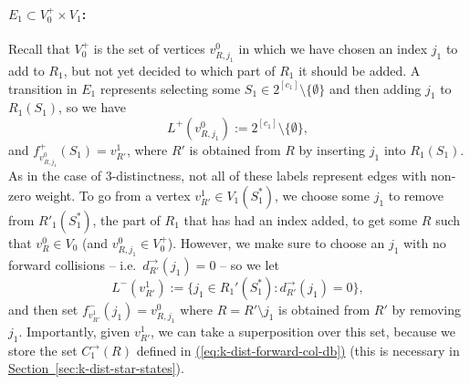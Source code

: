\documentclass{article}
\newcommand{\eq}[1]{\hyperref[eq:#1]{(\ref*{eq:#1})}}
\renewcommand{\sec}[1]{\hyperref[sec:#1]{Section~\ref*{sec:#1}}}
\renewcommand{\>}{\rangle}
\newcommand{\<}{\langle}
\renewcommand{\(}{\left(}
\renewcommand{\)}{\right)}
\begin{document}
\paragraph{$E_1\subset V_0^+\times V_1$:} Recall that $V_0^+$ is the set of vertices $v_{R,j_1}^0$ in which we have chosen an index $j_1$ to add to $R_1$, but not yet decided to which part of $R_1$ it should be added. A transition in $E_1$ represents selecting some $S_1\in 2^{[c_1]}\setminus\{\emptyset\}$ and then adding $j_1$ to $R_1(S_1)$, so we have 
$$L^+(v_{R,j_1}^0):= 2^{[c_1]}\setminus\{\emptyset\},$$
and $f^+_{v^0_{R,j_1}}(S_1)=v^1_{R'}$, where $R'$ is obtained from $R$ by inserting $j_1$ into $R_1(S_1)$. As in the case of 3-distinctness, not all of these labels represent edges with non-zero weight.
To go from a vertex $v_{R'}^1\in V_1(S_1^*)$, we choose some $j_1$ to remove from $R'_1(S_1^*)$, the part of $R_1$ that has had an index added, to get some $R$ such that $v_R^0\in V_0$ (and $v_{R,j_1}^0\in V_0^+$). However, we make sure to choose an $j_1$ with no forward collisions -- i.e.~$d^{\rightarrow}_{R'}(j_1)=0$ -- so we let
$$L^-(v_{R'}^1):=\{j_1\in R_1'(S_1^*):d_{R'}^{\rightarrow}(j_1)=0\},$$
and then set $f^-_{v_{R'}^1}(j_1)=v_{R,j_1}^0$ where $R=R'\setminus j_1$ is obtained from $R'$ by removing $j_1$. Importantly, given $v^1_{R'}$, we can take a superposition over this set, because we store the set $C^{\rightarrow}_1(R)$ defined in \eq{k-dist-forward-col-db} (this is necessary in \sec{k-dist-star-states}).
\end{document}

